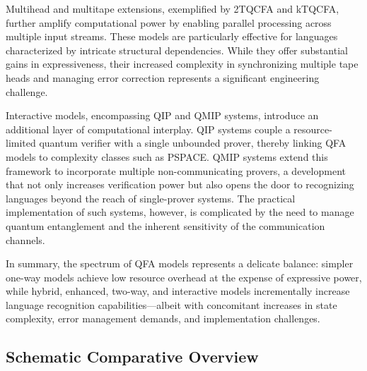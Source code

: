 Multihead and multitape extensions, exemplified by 2TQCFA and kTQCFA, further amplify computational power by enabling parallel processing across multiple input streams. These models are particularly effective for languages characterized by intricate structural dependencies. While they offer substantial gains in expressiveness, their increased complexity in synchronizing multiple tape heads and managing error correction represents a significant engineering challenge.

Interactive models, encompassing QIP and QMIP systems, introduce an additional layer of computational interplay. QIP systems couple a resource-limited quantum verifier with a single unbounded prover, thereby linking QFA models to complexity classes such as PSPACE. QMIP systems extend this framework to incorporate multiple non-communicating provers, a development that not only increases verification power but also opens the door to recognizing languages beyond the reach of single-prover systems. The practical implementation of such systems, however, is complicated by the need to manage quantum entanglement and the inherent sensitivity of the communication channels.

\vspace{0.5em}
In summary, the spectrum of QFA models represents a delicate balance: simpler one-way models achieve low resource overhead at the expense of expressive power, while hybrid, enhanced, two-way, and interactive models incrementally increase language recognition capabilities—albeit with concomitant increases in state complexity, error management demands, and implementation challenges.

\subsection*{Schematic Comparative Overview}

